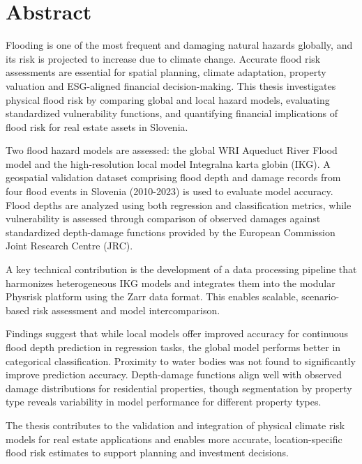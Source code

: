 % 
\chapter*{Abstract}
Flooding is one of the most frequent and damaging natural hazards globally, and its risk is projected to increase due to climate change. Accurate flood risk assessments are essential for spatial planning, climate adaptation, property valuation and ESG-aligned financial decision-making. This thesis investigates physical flood risk by comparing global and local hazard models, evaluating standardized vulnerability functions, and quantifying financial implications of flood risk for real estate assets in Slovenia.

Two flood hazard models are assessed: the global WRI Aqueduct River Flood model and the high-resolution local model Integralna karta globin (IKG). A geospatial validation dataset comprising flood depth and damage records from four flood events in Slovenia (2010-2023) is used to evaluate model accuracy. Flood depths are analyzed using both regression and classification metrics, while vulnerability is assessed through comparison of observed damages against standardized depth-damage functions provided by the European Commission Joint Research Centre (JRC).

A key technical contribution is the development of a data processing pipeline that harmonizes heterogeneous IKG models and integrates them into the modular Physrisk platform using the Zarr data format. This enables scalable, scenario-based risk assessment and model intercomparison.

Findings suggest that while local models offer improved accuracy for continuous flood depth prediction in regression tasks, the global model performs better in categorical classification. Proximity to water bodies was not found to significantly improve prediction accuracy. Depth-damage functions align well with observed damage distributions for residential properties, though segmentation by property type reveals variability in model performance for different property types.

The thesis contributes to the validation and integration of physical climate risk models for real estate applications and enables more accurate, location-specific flood risk estimates to support planning and investment decisions.
